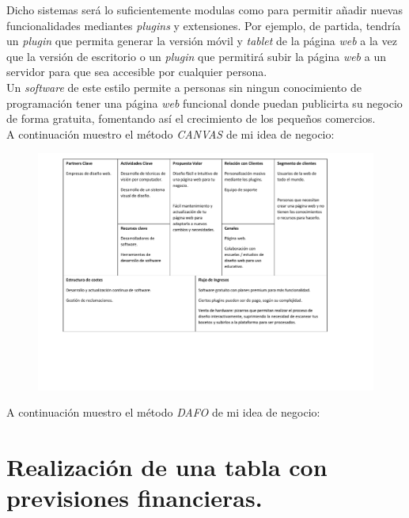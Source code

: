 \documentclass[12pt]{article}
\begin{document}
Dicho sistemas será lo suficientemente modulas como para permitir añadir nuevas funcionalidades mediantes \textit{plugins} y extensiones. Por ejemplo, de partida, tendría un \textit{plugin} que permita generar la versión móvil y \textit{tablet} de la página \textit{web} a la vez que la versión de escritorio o un \textit{plugin} que permitirá subir la página \textit{web} a un servidor para que sea accesible por cualquier persona. \\

Un \textit{software} de este estilo permite a personas sin ningun conocimiento de programación tener una página \textit{web} funcional donde puedan publicirta su negocio de forma gratuita, fomentando así el crecimiento de los pequeños comercios. \\

A continuación muestro el método \textit{CANVAS} de mi idea de negocio:

\begin{figure}[H]
	\centering
	\includegraphics[width=\textwidth, trim={1.5cm 5cm 3.5cm 0.5cm}, clip]{canvas.pdf}
\end{figure}

A continuación muestro el método \textit{DAFO} de mi idea de negocio:





\section{Realización de una tabla con previsiones financieras.}
\end{document}
